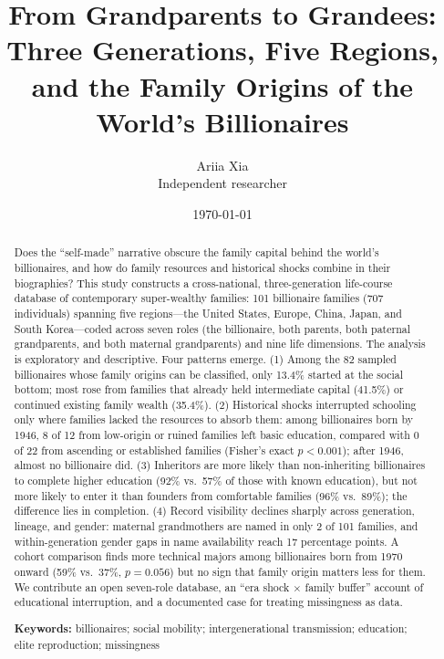 \documentclass[11pt,a4paper]{article}
\title{\bfseries From Grandparents to Grandees: Three Generations, Five Regions, and the Family Origins of the World's Billionaires}
\author{Ariia Xia\\[0.3em] {\small Independent researcher}}
\date{\today}
\begin{document}
\maketitle

\begin{abstract}
\noindent Does the ``self-made'' narrative obscure the family capital behind the world's billionaires, and how do family resources and historical shocks combine in their biographies? This study constructs a cross-national, three-generation life-course database of contemporary super-wealthy families: 101 billionaire families (707 individuals) spanning five regions---the United States, Europe, China, Japan, and South Korea---coded across seven roles (the billionaire, both parents, both paternal grandparents, and both maternal grandparents) and nine life dimensions. The analysis is exploratory and descriptive. Four patterns emerge. (1) Among the 82 sampled billionaires whose family origins can be classified, only 13.4\% started at the social bottom; most rose from families that already held intermediate capital (41.5\%) or continued existing family wealth (35.4\%). (2) Historical shocks interrupted schooling only where families lacked the resources to absorb them: among billionaires born by 1946, 8 of 12 from low-origin or ruined families left basic education, compared with 0 of 22 from ascending or established families (Fisher's exact $p<0.001$); after 1946, almost no billionaire did. (3) Inheritors are more likely than non-inheriting billionaires to complete higher education (92\% vs.\ 57\% of those with known education), but not more likely to enter it than founders from comfortable families (96\% vs.\ 89\%); the difference lies in completion. (4) Record visibility declines sharply across generation, lineage, and gender: maternal grandmothers are named in only 2 of 101 families, and within-generation gender gaps in name availability reach 17 percentage points. A cohort comparison finds more technical majors among billionaires born from 1970 onward (59\% vs.\ 37\%, $p=0.056$) but no sign that family origin matters less for them. We contribute an open seven-role database, an ``era shock $\times$ family buffer'' account of educational interruption, and a documented case for treating missingness as data.

\medskip
\noindent\textbf{Keywords:} billionaires; social mobility; intergenerational transmission; education; elite reproduction; missingness
\end{abstract}

\end{document}
